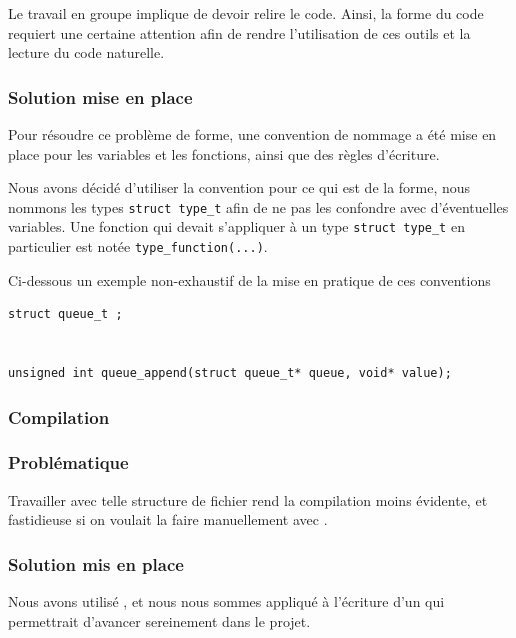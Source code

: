 Le travail en groupe implique de devoir relire le code. Ainsi, la forme du code requiert une certaine attention afin de rendre l'utilisation de ces outils et la lecture du code naturelle.


\subsubsection*{Solution mise en place}

Pour résoudre ce problème de forme, une convention de nommage a été mise en place pour les variables et les fonctions, ainsi que des règles d'écriture. 

Nous avons décidé d'utiliser la convention  pour ce qui est de la forme, nous nommons les types \lstinline{struct type_t} afin de ne pas les confondre avec d'éventuelles variables. Une fonction qui devait s'appliquer à un type \lstinline{struct type_t} en particulier est notée \lstinline{type_function(...)}.

    Ci-dessous un exemple non-exhaustif de la mise en pratique de ces conventions

\begin{lstlisting}[frame=single, caption={Exemples de mise en pratique de ces conventions}]
struct queue_t ;


unsigned int queue_append(struct queue_t* queue, void* value);
\end{lstlisting}




\subsubsection*{Compilation}


\subsubsection*{Problématique}


    Travailler avec telle structure de fichier rend la compilation moins évidente, et fastidieuse si on voulait 
la faire manuellement avec .


\subsubsection*{Solution mis en place}

    Nous avons utilisé , et nous nous sommes appliqué à l'écriture d'un  qui
permettrait d'avancer sereinement dans le projet.


